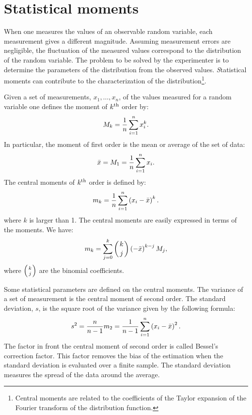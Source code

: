 \section{Statistical moments}
\label{sec:moments} When one measures the values of an observable
random variable, each measurement gives a different magnitude.
Assuming measurement errors are negligible, the fluctuation of the
measured values correspond to the distribution of the random
variable. The problem to be solved by the experimenter is to
determine the parameters of the distribution from the observed
values. {\textsl Statistical moments} can contribute to the
characterization of the distribution\footnote{Central moments are
related to the coefficients of the Taylor expansion of the Fourier
transform of the distribution function.}.

Given a set of measurements, $x_1,\ldots,x_n$, of the values
measured for a random variable one defines the moment of $k^{\mathop{\textrm{th}}}$
order by:
\begin{equation}
  M_k={1\over n}\sum_{i=1}^n x_i^k.
\end{equation}
In particular, the moment of first order is the mean or average of
the set of data:
\begin{equation}
\label{eq:average}
  \bar{x}=M_1={1\over n}\sum_{i=1}^n x_i.
\end{equation}
The central moments of $k^{\mathop{\rm th}}$ order is defined by:
\begin{equation}
  m_k={1\over n}\sum_{i=1}^n \left(x_i-\bar{x}\right)^k.
\end{equation}
where $k$ is larger than 1. The central moments are easily
expressed in terms of the moments. We have:
\begin{equation}
  m_k=\sum_{j=0}^k \left({k \atop j}\right)\left(-\bar{x}\right)^{k-j}M_j,
\end{equation}
where $\left({k \atop j}\right)$ are the binomial coefficients.

Some statistical parameters are defined on the central moments.
The variance of a set of measurement is the central moment of
second order. The standard deviation, $s$, is the square root of
the variance given by the following formula:
\begin{equation}
s^2={\displaystyle n \over \displaystyle n-1}m_2 ={\displaystyle 1
\over \displaystyle n-1} \sum_{i=1}^n \left(x_i-\bar{x}\right)^2.
\end{equation}
The factor in front the central moment of second order is called
Bessel's correction factor. This factor removes the bias of the
estimation when the standard deviation is evaluated over a finite
sample. The standard deviation measures the spread of the data
around the average.

